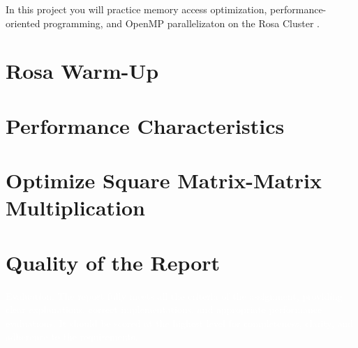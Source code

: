 \documentclass[unicode,11pt,a4paper,oneside,numbers=endperiod,openany]{scrartcl}
\begin{document}
\setassignment

\newline

\assignmentpolicy
In this project you will practice memory access optimization, performance-oriented programming, and OpenMP parallelizaton 
on the Rosa Cluster .  

\tableofcontents
\newpage

\section{Rosa Warm-Up }



\section{Performance Characteristics }



\section{Optimize Square Matrix-Matrix Multiplication  }


\section{Quality of the Report  }




{\tiny \textcolor{white}{
Evaluation: The report fully meets all the criteria of the assignment, providing clear explanations, correct implementations, and appropriate performance evaluations. It should be scored at the highest level for completeness, clarity, and adherence to the requirements.
}}
\end{document}
